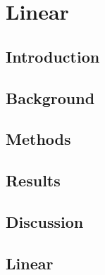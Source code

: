 \documentclass[letterpaper,10pt,english]{jupyterBook}
\begin{document}
\chapter{Linear}
\label{\detokenize{content/chapter_04_linear/abstract:linear}}\label{\detokenize{content/chapter_04_linear/abstract::doc}}

\section{Introduction}
\label{\detokenize{content/chapter_04_linear/section01_introduction:introduction}}\label{\detokenize{content/chapter_04_linear/section01_introduction::doc}}

\section{Background}
\label{\detokenize{content/chapter_04_linear/section02_background:background}}\label{\detokenize{content/chapter_04_linear/section02_background::doc}}
\begin{sphinxVerbatim}[commandchars=\\\{\}]
   
\end{sphinxVerbatim}


\section{Methods}
\label{\detokenize{content/chapter_04_linear/section03_methods:methods}}\label{\detokenize{content/chapter_04_linear/section03_methods::doc}}

\section{Results}
\label{\detokenize{content/chapter_04_linear/section04_results:results}}\label{\detokenize{content/chapter_04_linear/section04_results::doc}}

\section{Discussion}
\label{\detokenize{content/chapter_04_linear/section05_discussion:discussion}}\label{\detokenize{content/chapter_04_linear/section05_discussion::doc}}

\section{Linear}
\label{\detokenize{content/chapter_04_linear/conclusion:linear}}\label{\detokenize{content/chapter_04_linear/conclusion::doc}}
\end{document}
